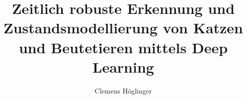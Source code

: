 \documentclass[type=bachelor,degree=engineering,theme=default,language=german,titlelanguage=german,smartquotes=true]{hgbthesis}
\begin{document}
\title{Zeitlich robuste Erkennung und Zustandsmodellierung von Katzen und Beutetieren mittels Deep Learning}
\author{Clemens Höglinger}

\frontmatter
\maketitle

\tableofcontents

		
			

\mainmatter











\backmatter

\MakeBibliography
\end{document}

